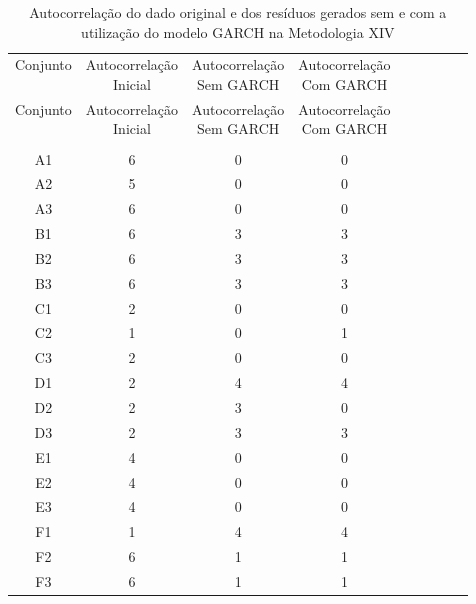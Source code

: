\begin{center}
\begin{longtable}{ccccc|cccc}
\toprule
\rowcolor{white}
\caption[Metodologia XIV: evolução da autocorrelação]{Autocorrelação do dado
original e dos resíduos gerados sem e com a utilização do modelo GARCH na
Metodologia XIV} \label{tab:EvolucaoAutocorrelacaoMet14}\\
\midrule
Conjunto & \specialcell{Autocorrelação\\Inicial} & \specialcell{Autocorrelação\\Sem
GARCH} & \specialcell{Autocorrelação\\Com GARCH} \\
\midrule
\endfirsthead 
\midrule
\rowcolor{white}
Conjunto & \specialcell{Autocorrelação\\Inicial} & \specialcell{Autocorrelação\\Sem
GARCH} & \specialcell{Autocorrelação\\Com GARCH} \\
\toprule
\endhead
\midrule \\ %
\endfoot
\bottomrule 
\endlastfoot
A1    & 6     & 0     & 0 \\
A2    & 5     & 0     & 0 \\
A3    & 6     & 0     & 0 \\
B1    & 6     & 3     & 3 \\
B2    & 6     & 3     & 3 \\
B3    & 6     & 3     & 3 \\
C1    & 2     & 0     & 0 \\
C2    & 1     & 0     & 1 \\
C3    & 2     & 0     & 0 \\
D1    & 2     & 4     & 4 \\
D2    & 2     & 3     & 0 \\
D3    & 2     & 3     & 3 \\
E1    & 4     & 0     & 0 \\
E2    & 4     & 0     & 0 \\
E3    & 4     & 0     & 0 \\
F1    & 1     & 4     & 4 \\
F2    & 6     & 1     & 1 \\
F3    & 6     & 1     & 1 \\

\end{longtable}
\end{center}
